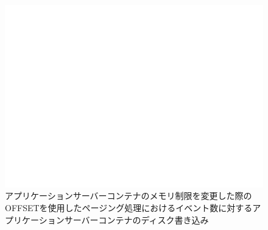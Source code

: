 \documentclass[../../../../../main]{subfiles}
\begin{document}
    \begin{figure}[H]
        \centering
        \includegraphics[width=12cm]{graph}
        \caption{アプリケーションサーバーコンテナのメモリ制限を変更した際のOFFSETを使用したページング処理におけるイベント数に対するアプリケーションサーバーコンテナのディスク書き込み}
        \label{fig:paging-offset-change-app-memory-limit-app-disk-in-app_4_db_1_1024}
    \end{figure}
\end{document}
